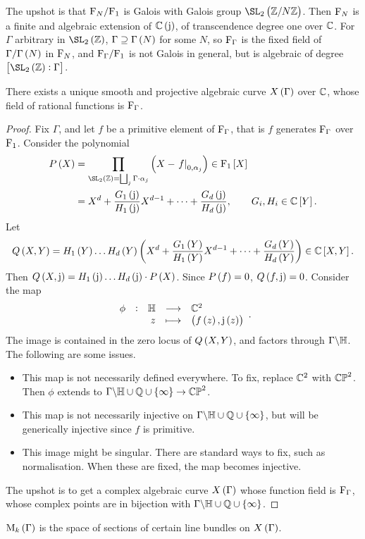 The upshot is that $ \mathrm{F}_N / \mathrm{F}_1 $ is Galois with Galois group $ \SL_2\br{\ZZ / N\ZZ} $. Then $ \mathrm{F}_N $ is a finite and algebraic extension of $ \CC\br{\j} $, of transcendence degree one over $ \mathbb{C} $. For $ \Gamma $ arbitrary in $ \SL_2\br{\ZZ} $, $ \Gamma \supseteq \Gamma\br{N} $ for some $ N $, so $ \mathrm{F}_\Gamma $ is the fixed field of $ \Gamma / \Gamma\br{N} $ in $ \mathrm{F}_N $, and $ \mathrm{F}_\Gamma / \mathrm{F}_1 $ is not Galois in general, but is algebraic of degree $ \sbr{\SL_2\br{\ZZ} : \Gamma} $.

\begin{proposition}
There exists a unique smooth and projective algebraic curve $ X\br{\Gamma} $ over $ \mathbb{C} $, whose field of rational functions is $ \mathrm{F}_\Gamma $.
\end{proposition}

\begin{proof}
Fix $ \Gamma $, and let $ f $ be a primitive element of $ \mathrm{F}_\Gamma $, that is $ f $ generates $ \mathrm{F}_\Gamma $ over $ \mathrm{F}_1 $. Consider the polynomial
\begin{align*}
P\br{X}
& = \prod_{\SL_2\br{\ZZ} = \bigsqcup_j \Gamma \cdot \alpha_j} \br{X - \eval{f}_{0, \alpha_j}} \in \F_1\sbr{X} \\
& = X^d + \dfrac{G_1\br{\j}}{H_1\br{\j}}X^{d - 1} + \dots + \dfrac{G_d\br{\j}}{H_d\br{\j}}, \qquad G_i, H_i \in \CC\sbr{Y}.
\end{align*}
Let
$$ Q\br{X, Y} = H_1\br{Y} \dots H_d\br{Y}\br{X^d + \dfrac{G_1\br{Y}}{H_1\br{Y}}X^{d - 1} + \dots + \dfrac{G_d\br{Y}}{H_d\br{Y}}} \in \CC\sbr{X, Y}. $$
Then $ Q\br{X, \j} = H_1\br{\j} \dots H_d\br{\j} \cdot P\br{X} $. Since $ P\br{f} = 0 $, $ Q\br{f, \j} = 0 $. Consider the map
$$ \function[\phi]{\HH}{\CC^2}{z}{\br{f\br{z}, \j\br{z}}}. $$
The image is contained in the zero locus of $ Q\br{X, Y} $, and factors through $ \Gamma \backslash \mathbb{H} $. The following are some issues.
\begin{itemize}
\item This map is not necessarily defined everywhere. To fix, replace $ \mathbb{C}^2 $ with $ \mathbb{CP}^2 $. Then $ \phi $ extends to $ \Gamma \backslash \HH \cup \QQ \cup \cbr{\infty} \to \CP^2 $.
\item This map is not necessarily injective on $ \Gamma \backslash \HH \cup \QQ \cup \cbr{\infty} $, but will be generically injective since $ f $ is primitive.
\item This image might be singular. There are standard ways to fix, such as normalisation. When these are fixed, the map becomes injective.
\end{itemize}
The upshot is to get a complex algebraic curve $ X\br{\Gamma} $ whose function field is $ \mathrm{F}_\Gamma $, whose complex points are in bijection with $ \Gamma \backslash \HH \cup \QQ \cup \cbr{\infty} $.
\end{proof}

$ \M_k\br{\Gamma} $ is the space of sections of certain line bundles on $ X\br{\Gamma} $.

